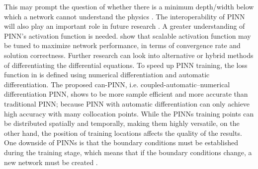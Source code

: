 \documentclass[pdflatex,sn-basic]{sn-jnl}%
\theoremstyle{thmstyleone}%
\theoremstyle{thmstyletwo}%
\theoremstyle{thmstylethree}%
\begin{document}
This may prompt the question of whether there is a minimum depth/width below which a network cannot understand the physics \citep{Tor2020_TheoryTrainingDeep_ViaTRVSA}.
%
The interoperability of PINN will also play an important role in future research \citep{Rud2022_InterpretableMachineLearning_CheRCC}.
%
%
A greater understanding of PINN's activation function is needed.
\cite{Jag2020_AdaptiveActivationFunctions_KawJKK} show that scalable  activation function may be tuned to maximize network performance, in terms of convergence rate and solution correctness.
%
%
%
%
%
Further research can look into alternative or hybrid methods of differentiating the differential equations. 
To speed up PINN training, the loss function in \cite{Chi2022_CanPinnFast_WonCWO}
is defined using numerical differentiation and automatic differentiation.
The proposed can-PINN, i.e. coupled-automatic–numerical differentiation PINN,  shows to be more sample efficient and more accurate than traditional PINN; because PINN with automatic differentiation can only achieve high accuracy with many collocation points. 
%
While the PINNs training points can be distributed spatially and temporally, making them highly versatile, on the other hand, the position of training locations affects the quality of the results.
%
%
One downside of PINNs is that the boundary conditions must be established during the training stage, which means that if the boundary conditions change, a new network must be created \citep{Wie2021_DeepLearningNano_ArbWAA}. 
\end{document}
